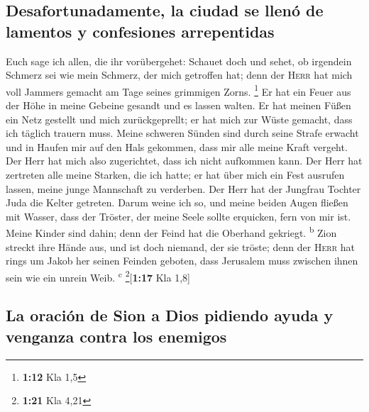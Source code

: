 \hypertarget{desafortunadamente-la-ciudad-se-llenuxf3-de-lamentos-y-confesiones-arrepentidas}{%
\subsection{Desafortunadamente, la ciudad se llenó de lamentos y
confesiones
arrepentidas}\label{desafortunadamente-la-ciudad-se-llenuxf3-de-lamentos-y-confesiones-arrepentidas}}

 Euch sage ich allen, die ihr vorübergehet: Schauet doch
und sehet, ob irgendein Schmerz sei wie mein Schmerz, der mich getroffen
hat; denn der \textsc{Herr} hat mich voll Jammers gemacht am Tage seines
grimmigen Zorns. \footnote{\textbf{1:12} Kla 1,5}  Er hat
ein Feuer aus der Höhe in meine Gebeine gesandt und es lassen walten. Er
hat meinen Füßen ein Netz gestellt und mich zurückgeprellt; er hat mich
zur Wüste gemacht, dass ich täglich trauern muss.  Meine
schweren Sünden sind durch seine Strafe erwacht und in Haufen mir auf
den Hals gekommen, dass mir alle meine Kraft vergeht. Der Herr hat mich
also zugerichtet, dass ich nicht aufkommen kann.  Der
Herr hat zertreten alle meine Starken, die ich hatte; er hat über mich
ein Fest ausrufen lassen, meine junge Mannschaft zu verderben. Der Herr
hat der Jungfrau Tochter Juda die Kelter getreten.  Darum
weine ich so, und meine beiden Augen fließen mit Wasser, dass der
Tröster, der meine Seele sollte erquicken, fern von mir ist. Meine
Kinder sind dahin; denn der Feind hat die Oberhand gekriegt.
\textsuperscript{b}  Zion streckt ihre Hände aus, und ist
doch niemand, der sie tröste; denn der \textsc{Herr} hat rings um Jakob
her seinen Feinden geboten, dass Jerusalem muss zwischen ihnen sein wie
ein unrein Weib. \textsuperscript{c} \footnote{\textbf{1:21} Kla 4,21}{[}\textbf{1:17}
Kla 1,8{]}

\hypertarget{la-oraciuxf3n-de-sion-a-dios-pidiendo-ayuda-y-venganza-contra-los-enemigos}{%
\subsection{La oración de Sion a Dios pidiendo ayuda y venganza contra
los
enemigos}\label{la-oraciuxf3n-de-sion-a-dios-pidiendo-ayuda-y-venganza-contra-los-enemigos}}

